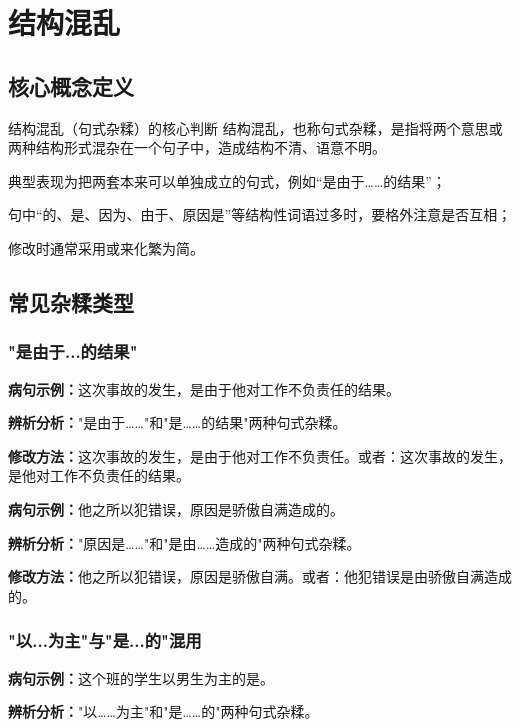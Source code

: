 \documentclass[a4paper,12pt]{ctexrep}
\newcommand{\exampleicon}{\textcolor{highlight}{\faExclamationTriangle}}
\newcommand{\analysisicon}{\textcolor{accent}{\faSearch}}
\newcommand{\revisionicon}{\textcolor{secondary}{\faCheckCircle}}
\begin{document}
\chapter{结构混乱}
\section{核心概念定义}
\begin{conceptbox}{结构混乱（句式杂糅）的核心判断}
结构混乱，也称句式杂糅，是指将两个意思或两种结构形式混杂在一个句子中，造成结构不清、语意不明。
\begin{focuspoints}
  \item 典型表现为把两套本来可以单独成立的句式，例如“是由于……的结果”；
  \item 句中“的、是、因为、由于、原因是”等结构性词语过多时，要格外注意是否互相；
  \item 修改时通常采用或来化繁为简。
\end{focuspoints}
\end{conceptbox}

\section{常见杂糅类型}
\subsection{"是由于...的结果"}
\exampleicon \textbf{病句示例：}这次事故的发生，是由于他对工作不负责任的结果。

\analysisicon \textbf{辨析分析：}"是由于……"和"是……的结果"两种句式杂糅。

\revisionicon \textbf{修改方法：}这次事故的发生，是由于他对工作不负责任。或者：这次事故的发生，是他对工作不负责任的结果。

\exampleicon \textbf{病句示例：}他之所以犯错误，原因是骄傲自满造成的。

\analysisicon \textbf{辨析分析：}"原因是……"和"是由……造成的"两种句式杂糅。

\revisionicon \textbf{修改方法：}他之所以犯错误，原因是骄傲自满。或者：他犯错误是由骄傲自满造成的。

\subsection{"以...为主"与"是...的"混用}
\exampleicon \textbf{病句示例：}这个班的学生以男生为主的是。

\analysisicon \textbf{辨析分析：}"以……为主"和"是……的"两种句式杂糅。
\end{document}
